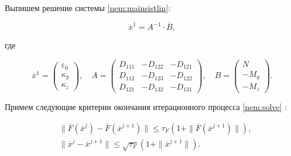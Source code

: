 Выпишем решение системы \eqref{nem:mainsistlin}:

\begin{equation}\label{nem:linsolve}

\overline{x}^1=A^{-1}\cdot\overline{B},

\end{equation}

где 

\begin{equation}\label{nem:19}

\overline{x}^1=\begin{pmatrix}

\varepsilon_0\\ \kappa_y \\ \kappa_z

\end{pmatrix},\quad

A=\begin{pmatrix}

D_{111}& -D_{122}& -D_{121}\\ D_{112}& -D_{123}& -D_{122}\\ 

D_{121}& -D_{132}& -D_{131}

\end{pmatrix}, \quad

B=\begin{pmatrix}

N\\ -M_y \\ -M_z

\end{pmatrix}.

\end{equation}



Примем следующие критерии окончания итерационного процесса \eqref{nem:solve} \cite{Gill}:

\begin{equation}\label{nem:ostanov}

\begin{aligned}

&\|\overline{F}\left(\overline{x}^j\right)-\overline{F}\left(\overline{x}^{j+1}\right)\|\le\tau_F\left(1+\|\overline{F}\left(\overline{x}^{j+1}\right)\|\right),\\

&\|\overline{x}^j-\overline{x}^{j+1}\|\le\sqrt{\tau_F}\left(1+\|\overline{x}^{j+1}\|\right).

\end{aligned}

\end{equation}

